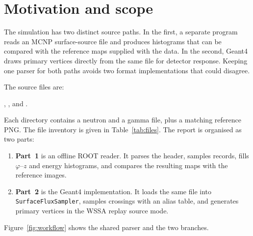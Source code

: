 \documentclass[11pt,a4paper]{article}
\begin{document}
\tableofcontents
\newpage

\section{Motivation and scope}

The simulation has two distinct source paths.  In the first, a separate program
reads an MCNP surface-source file and produces histograms that can be compared
with the reference maps supplied with the data.  In the second, Geant4 draws
primary vertices directly from the same file for detector response.  Keeping one
parser for both paths avoids two format implementations that could disagree.

The source files are:
\begin{center}
,
, and
.
\end{center}
Each directory contains a neutron and a gamma file, plus a matching reference
PNG.  The file inventory is given in Table~\ref{tab:files}.  The report is
organised as two parts:
\begin{enumerate}
  \item \textbf{Part~1} is an offline ROOT reader.  It parses the header,
        samples records, fills $\varphi$--$z$ and energy histograms, and compares
        the resulting maps with the reference images.
  \item \textbf{Part~2} is the Geant4 implementation.  It loads the same file
        into \texttt{SurfaceFluxSampler}, samples crossings with an alias table,
        and generates primary vertices in the WSSA replay source mode.
\end{enumerate}
Figure~\ref{fig:workflow} shows the shared parser and the two branches.
\end{document}
